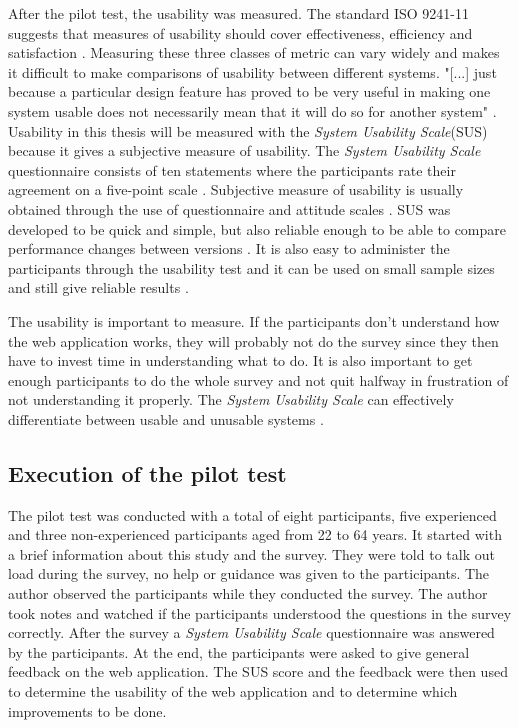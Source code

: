 After the pilot test, the usability was measured. The standard ISO 9241-11 suggests that measures of usability should cover effectiveness, efficiency and satisfaction \citep{ISO1998}. Measuring these three classes of metric can vary widely and makes it difficult to make comparisons of usability between different systems. "[...] just because a particular design feature has proved to be very useful in making one system usable does not necessarily mean that it will do so for another system" \citep{Brooke1996}. Usability in this thesis will be measured with the \textit{System Usability Scale}(SUS) because it gives a subjective measure of usability. The \textit{System Usability Scale} questionnaire consists of ten statements where the participants rate their agreement on a five-point scale \citep{Ben2009}. Subjective measure of usability is usually obtained through the use of questionnaire and attitude scales \citep{Brooke1996}. SUS was developed to be quick and simple, but also reliable enough to be able to compare performance changes between versions \citep{Brooke1996}. It is also easy to administer the participants through the usability test and it can be used on small sample sizes and still give reliable results \citep{Affairs2013}.  

The usability is important to measure. If the participants don't understand how the web application works, they will probably not do the survey since they then have to invest time in understanding what to do. %
It is also important to get enough participants to do the whole survey and not quit halfway in frustration of not understanding it properly. The \textit{System Usability Scale} can effectively differentiate between usable and unusable systems \citep{Affairs2013}. 

\subsection{Execution of the pilot test}
The pilot test was conducted with a total of eight participants, five experienced and three non-experienced participants aged from 22 to 64 years. It started with a brief information about this study and the survey. They were told to talk out load during the survey, no help or guidance was given to the participants. The author observed the participants while they conducted the survey. The author took notes and watched if the participants understood the questions in the survey correctly. After the survey a \textit{System Usability Scale} questionnaire was answered by the participants. At the end, the participants were asked to give general feedback on the web application. The SUS score and the feedback were then used to determine the usability of the web application and to determine which improvements to be done.  

